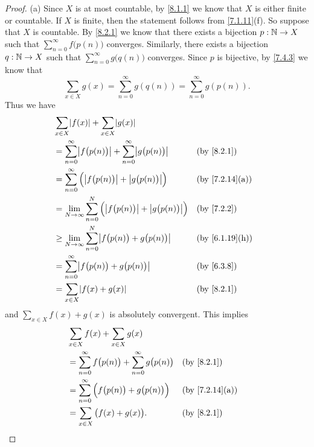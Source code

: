 \begin{proof}{(a)}
  Since \(X\) is at most countable, by \cref{8.1.1} we know that \(X\) is either finite or countable.
  If \(X\) is finite, then the statement follows from \cref{7.1.11}(f).
  So suppose that \(X\) is countable.
  By \cref{8.2.1} we know that there exists a bijection \(p : \mathbb{N} \to X\) such that \(\sum_{n = 0}^\infty f\big(p(n)\big)\) converges.
  Similarly, there exists a bijection \(q : \mathbb{N} \to X\) such that \(\sum_{n = 0}^\infty g\big(q(n)\big)\) converges.
  Since \(p\) is bijective, by \cref{7.4.3} we know that
  \[
    \sum_{x \in X} g(x) = \sum_{n = 0}^\infty g(q(n)) = \sum_{n = 0}^\infty g(p(n)).
  \]
  Thus we have
  \begin{align*}
     & \sum_{x \in X} \abs{f(x)} + \sum_{x \in X} \abs{g(x)}                                                                          \\
     & = \sum_{n = 0}^\infty \abs{f\big(p(n)\big)} + \sum_{n = 0}^\infty \abs{g\big(p(n)\big)}      &  & \by{8.2.1}                   \\
     & = \sum_{n = 0}^\infty \Big(\abs{f\big(p(n)\big)} + \abs{g\big(p(n)\big)}\Big)                &  & \text{(by \cref{7.2.14}(a))} \\
     & = \lim_{N \to \infty} \sum_{n = 0}^N \Big(\abs{f\big(p(n)\big)} + \abs{g\big(p(n)\big)}\Big) &  & \by{7.2.2}                   \\
     & \geq \lim_{N \to \infty} \sum_{n = 0}^N \abs{f\big(p(n)\big) + g\big(p(n)\big)}              &  & \text{(by \cref{6.1.19}(h))} \\
     & = \sum_{n = 0}^\infty \abs{f\big(p(n)\big) + g\big(p(n)\big)}                                &  & \by{6.3.8}                   \\
     & = \sum_{x \in X} \abs{f(x) + g(x)}                                                           &  & \by{8.2.1}
  \end{align*}
  and \(\sum_{x \in X} f(x) + g(x)\) is absolutely convergent.
  This implies
  \begin{align*}
     & \sum_{x \in X} f(x) + \sum_{x \in X} g(x)                                                                     \\
     & = \sum_{n = 0}^\infty f\big(p(n)\big) + \sum_{n = 0}^\infty g\big(p(n)\big) &  & \by{8.2.1}                   \\
     & = \sum_{n = 0}^\infty \Big(f\big(p(n)\big) + g\big(p(n)\big)\Big)           &  & \text{(by \cref{7.2.14}(a))} \\
     & = \sum_{x \in X} \big(f(x) + g(x)\big).                                     &  & \by{8.2.1}
  \end{align*}
\end{proof}

